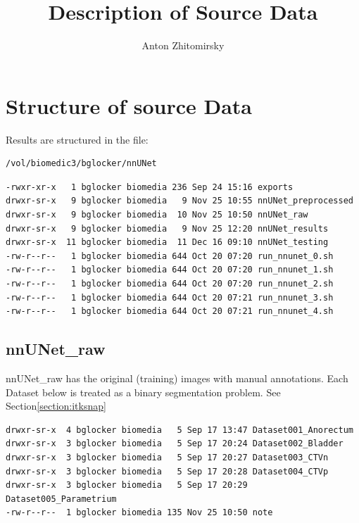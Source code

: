\documentclass[11pt]{article}
\title{Description of Source Data}
\author{Anton Zhitomirsky}
\begin{document}
\maketitle

\tableofcontents

\section{Structure of source Data}

Results are structured in the file:

\begin{lstlisting}[language=bash]
/vol/biomedic3/bglocker/nnUNet
\end{lstlisting}

\begin{lstlisting}[language=inform]
-rwxr-xr-x   1 bglocker biomedia 236 Sep 24 15:16 exports
drwxr-sr-x   9 bglocker biomedia   9 Nov 25 10:55 nnUNet_preprocessed
drwxr-sr-x   9 bglocker biomedia  10 Nov 25 10:50 nnUNet_raw
drwxr-sr-x   9 bglocker biomedia   9 Nov 25 12:20 nnUNet_results
drwxr-sr-x  11 bglocker biomedia  11 Dec 16 09:10 nnUNet_testing
-rw-r--r--   1 bglocker biomedia 644 Oct 20 07:20 run_nnunet_0.sh
-rw-r--r--   1 bglocker biomedia 644 Oct 20 07:20 run_nnunet_1.sh
-rw-r--r--   1 bglocker biomedia 644 Oct 20 07:20 run_nnunet_2.sh
-rw-r--r--   1 bglocker biomedia 644 Oct 20 07:21 run_nnunet_3.sh
-rw-r--r--   1 bglocker biomedia 644 Oct 20 07:21 run_nnunet_4.sh
\end{lstlisting}

\subsection{nnUNet\_raw}\label{section:raw}

nnUNet\_raw has the original (training) images with manual annotations. Each Dataset below is treated as a binary segmentation problem. See Section\ref{section:itksnap}

\begin{lstlisting}[language=inform]
drwxr-sr-x  4 bglocker biomedia   5 Sep 17 13:47 Dataset001_Anorectum
drwxr-sr-x  3 bglocker biomedia   5 Sep 17 20:24 Dataset002_Bladder
drwxr-sr-x  3 bglocker biomedia   5 Sep 17 20:27 Dataset003_CTVn
drwxr-sr-x  3 bglocker biomedia   5 Sep 17 20:28 Dataset004_CTVp
drwxr-sr-x  3 bglocker biomedia   5 Sep 17 20:29 Dataset005_Parametrium
-rw-r--r--  1 bglocker biomedia 135 Nov 25 10:50 note
\end{lstlisting}
\end{document}

